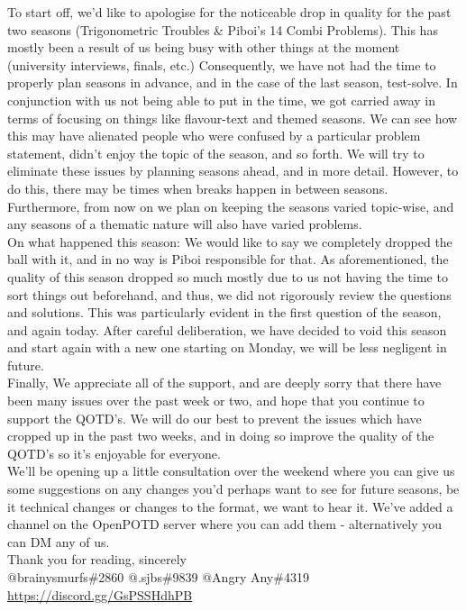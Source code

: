 To start off, we’d like to apologise for the noticeable drop in quality for the past two seasons (Trigonometric Troubles \& Piboi’s 14 Combi Problems). This has mostly been a result of us being busy with other things at the moment (university interviews, finals, etc.) Consequently, we have not had the time to properly plan seasons in advance, and in the case of the last season, test-solve. In conjunction with us not being able to put in the time, we got carried away in terms of focusing on things like flavour-text and themed seasons. We can see how this may have alienated people who were confused by a particular problem statement, didn’t enjoy the topic of the season, and so forth. We will try to eliminate these issues by planning seasons ahead, and in more detail. However, to do this, there may be times when breaks happen in between seasons. Furthermore, from now on we plan on keeping the seasons varied topic-wise, and any seasons of a thematic nature will also have varied problems.\\

On what happened this season: We would like to say we completely dropped the ball with it, and in no way is Piboi responsible for that. As aforementioned, the quality of this season dropped so much mostly due to us not having the time to sort things out beforehand, and thus, we did not rigorously review the questions and solutions. This was particularly evident in the first question of the season, and again today. After careful deliberation, we have decided to void this season and start again with a new one starting on Monday, we will be less negligent in future.\\

Finally, We appreciate all of the support, and are deeply sorry that there have been many issues over the past week or two, and hope that you continue to support the QOTD's. We will do our best to prevent the issues which have cropped up in the past two weeks, and in doing so improve the quality of the QOTD’s so it’s enjoyable for everyone.\\ 

We’ll be opening up a little consultation over the weekend where you can give us some suggestions on any changes you’d perhaps want to see for future seasons, be it technical changes or changes to the format, we want to hear it. We’ve added a channel on the OpenPOTD server where you can add them - alternatively you can DM any of us.\\

Thank you for reading, sincerely \\

@brainysmurfs\#2860  @.sjbs\#9839 @Angry Any\#4319 \\

\url{https://discord.gg/GsPSSHdhPB}